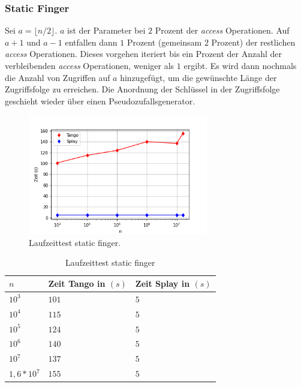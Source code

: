\documentclass[a4paper,12pt]{article}
\begin{document}
\subsubsection{Static Finger}
Sei $a = \lfloor n / 2\rfloor$.  $a$ ist der Parameter bei $2$ Prozent der \textit{access} Operationen. Auf $a+1$ und $a-1$ entfallen dann $1$ Prozent (gemeinsam $2$ Prozent) der restlichen \textit{access} Operationen. Dieses vorgehen iteriert bis ein Prozent der Anzahl der verbleibenden \textit{access} Operationen, weniger als $1$ ergibt. Es wird dann nochmals die Anzahl von Zugriffen auf $a$ hinzugefügt, um die gewünschte Länge der Zugriffsfolge zu erreichen.  Die Anordnung der Schlüssel in der Zugriffsfolge geschieht wieder über einen Pseudozufallsgenerator. 
 \begin{figure}[H]
 	\centering
 	\includegraphics[width=0.7\textwidth]{"Medien/laufzeittest/diagramm/staticfinger"}
 	\caption{Laufzeittest static finger.}
 \end{figure}
 \begin{table}[H]
	\begin{center}
		\begin{tabular}[c]{|l|l|l|}
			\hline
			$n$ & Zeit Tango in $\left(s\right)$ &Zeit Splay in $\left(s\right)$ \\
			\hline
			$10^3$ & $101$ &$5$ \\
			\hline
			$10^4$  & $115$ &$5$  \\
			\hline
			$10^5$  & $124$ &$5$  \\
			\hline
			$10^6$  & $140$ &$5$  \\
			\hline
			$10^7$  & $137$ &$5$  \\
			\hline
			$1,6 *10^7$  & $155$ &$5$  \\
			\hline
		\end{tabular}
		\caption{Laufzeittest static finger} 
	\end{center}
\end{table}
\end{document}
